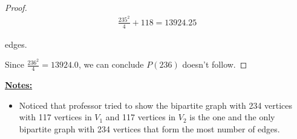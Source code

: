 \documentclass[12pt]{article}
\begin{document}
\begin{enumerate}[a.]
\begin{proof}
        \setcounter{equation}{0}
        \begin{align}
            \frac{235^2}{4} + 118 = 13924.25
        \end{align}

        edges.

        \bigskip

        Since $\frac{236^2}{4} = 13924.0$, we can conclude $P(236)$ doesn't follow.

    \end{proof}

    \bigskip

    \underline{\textbf{Notes:}}

    \begin{itemize}
        \item Noticed that professor tried to show the bipartite graph with
        234 vertices with 117 vertices in $V_1$ and 117 vertices in $V_2$ is the
        one and the only bipartite graph with 234 vertices that form the most number of edges.
    \end{itemize}














\end{enumerate}
\end{document}
